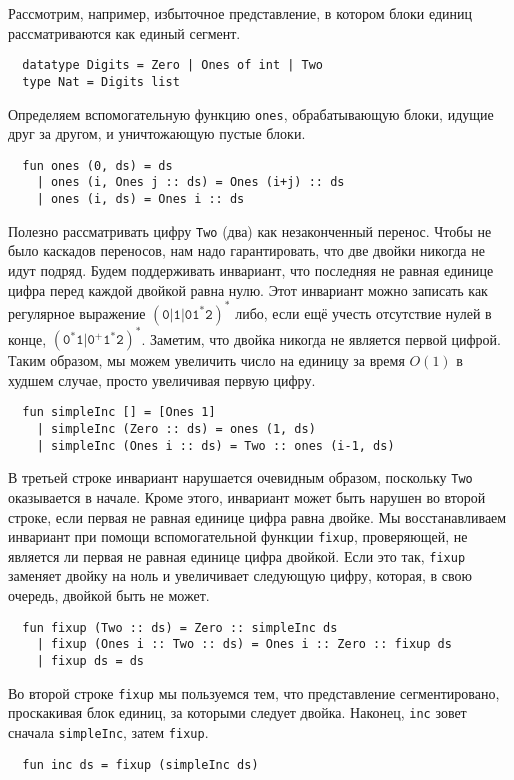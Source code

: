 \begin{frame}[fragile]{}
Рассмотрим, например, избыточное представление, в котором блоки единиц
рассматриваются как единый сегмент.
\begin{lstlisting}
  datatype Digits = Zero | Ones of int | Two
  type Nat = Digits list
\end{lstlisting}
Определяем вспомогательную функцию \lstinline!ones!, обрабатывающую
блоки, идущие друг за другом, и уничтожающую пустые блоки.
\begin{lstlisting}
  fun ones (0, ds) = ds
    | ones (i, Ones j :: ds) = Ones (i+j) :: ds
    | ones (i, ds) = Ones i :: ds
\end{lstlisting}
Полезно рассматривать цифру \lstinline!Two! (два) как незаконченный
перенос. Чтобы не было каскадов переносов, нам надо гарантировать, что
две двойки никогда не идут подряд. Будем поддерживать инвариант, что
последняя не равная единице цифра перед каждой двойкой равна
нулю. Этот инвариант можно записать как регулярное выражение
$\mathtt{(0|1|01^*2)^*}$ либо, если ещё учесть отсутствие нулей в
конце, $\mathtt{(0^*1 | 0^+1^*2)^*}$. Заметим, что двойка никогда не
является первой цифрой. Таким образом, мы можем увеличить число на
единицу за время $O(1)$ в худшем случае, просто увеличивая первую
цифру.
\begin{lstlisting}
  fun simpleInc [] = [Ones 1]
    | simpleInc (Zero :: ds) = ones (1, ds)
    | simpleInc (Ones i :: ds) = Two :: ones (i-1, ds)
\end{lstlisting}
В третьей строке инвариант нарушается очевидным образом, поскольку
\lstinline!Two! оказывается в начале. Кроме этого, инвариант может
быть нарушен во второй строке, если первая не равная единице цифра
равна двойке. Мы восстанавливаем инвариант при помощи вспомогательной
функции \lstinline!fixup!, проверяющей, не является ли первая не
равная единице цифра двойкой. Если это так, \lstinline!fixup! заменяет
двойку на ноль и увеличивает следующую цифру, которая, в свою очередь,
двойкой быть не может.
\begin{lstlisting}
  fun fixup (Two :: ds) = Zero :: simpleInc ds
    | fixup (Ones i :: Two :: ds) = Ones i :: Zero :: fixup ds
    | fixup ds = ds
\end{lstlisting}
Во второй строке \lstinline!fixup! мы пользуемся тем, что представление
сегментировано, проскакивая блок единиц, за которыми следует
двойка. Наконец, \lstinline!inc! зовет сначала \lstinline!simpleInc!,
затем \lstinline!fixup!.
\begin{lstlisting}
  fun inc ds = fixup (simpleInc ds)
\end{lstlisting}

\end{frame}

